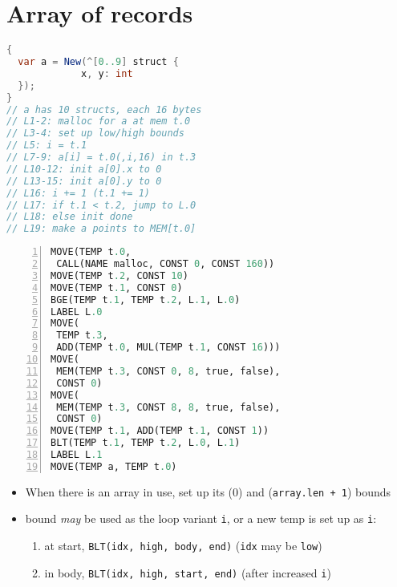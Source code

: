 \section*{Array of records}
\begin{minipage}{.45\linewidth}
\begin{lstlisting}[language=Java,frame=none,morekeywords={New, struct}]
{
  var a = New(^[0..9] struct {
             x, y: int
  });
}
// a has 10 structs, each 16 bytes
// L1-2: malloc for a at mem t.0
// L3-4: set up low/high bounds
// L5: i = t.1
// L7-9: a[i] = t.0(,i,16) in t.3
// L10-12: init a[0].x to 0
// L13-15: init a[0].y to 0
// L16: i += 1 (t.1 += 1)
// L17: if t.1 < t.2, jump to L.0
// L18: else init done
// L19: make a points to MEM[t.0]
\end{lstlisting}
\end{minipage}
\begin{minipage}{.55\linewidth}
\begin{lstlisting}[language=Python,frame=none,numbers=left,numbersep=4pt]
MOVE(TEMP t.0,
 CALL(NAME malloc, CONST 0, CONST 160))
MOVE(TEMP t.2, CONST 10)
MOVE(TEMP t.1, CONST 0)
BGE(TEMP t.1, TEMP t.2, L.1, L.0)
LABEL L.0
MOVE(
 TEMP t.3,
 ADD(TEMP t.0, MUL(TEMP t.1, CONST 16)))
MOVE(
 MEM(TEMP t.3, CONST 0, 8, true, false),
 CONST 0)
MOVE(
 MEM(TEMP t.3, CONST 8, 8, true, false),
 CONST 0)
MOVE(TEMP t.1, ADD(TEMP t.1, CONST 1))
BLT(TEMP t.1, TEMP t.2, L.0, L.1)
LABEL L.1
MOVE(TEMP a, TEMP t.0)
\end{lstlisting}
\end{minipage}
\begin{itemize}
\item When there is an array in use, set up its  (0) and  (\texttt{array.len + 1}) bounds
\item {} bound \emph{may} be used as the loop variant \texttt{i}, or a new temp is set up as \texttt{i}:
  \begin{enumerate}
  \item at start, \texttt{BLT(idx, high, body, end)} (\texttt{idx} may be \texttt{low})
  \item in body, \texttt{BLT(idx, high, start, end)} (after increased \texttt{i})
  \end{enumerate}
\end{itemize}

